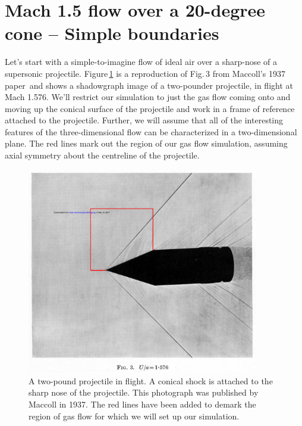 
\section{Mach 1.5 flow over a 20-degree cone -- Simple boundaries}
\label{cone20-simple-sec}
%
Let's start with a simple-to-imagine flow of ideal air over a sharp-nose of a supersonic projectile.
Figure\,\ref{cone20-flight-fig} is a reproduction of Fig.\,3 from Maccoll's 1937 paper\,\cite{maccoll_1937a} 
and shows a shadowgraph image of a two-pounder projectile, in flight at Mach 1.576.
We'll restrict our simulation to just the gas flow coming onto and moving up the conical surface 
of the projectile and work in a frame of reference attached to the projectile.
Further, we will assume that all of the interesting features of the three-dimensional flow can be 
characterized in a two-dimensional plane.
The red lines mark out the region of our gas flow simulation, 
assuming axial symmetry about the centreline of the projectile.

\begin{figure}[htbp]
\begin{center}
\includegraphics[width=0.9\textwidth, viewport=76 168 949 761, clip=true]{../2D/cone20-simple/maccoll-1937-fig3.pdf}
\end{center}
\caption{A two-pound projectile in flight.  A conical shock is attached to the sharp nose of the projectile. 
	 This photograph was published by Maccoll in 1937.
	 The red lines have been added to demark the region of gas flow for which we will set up our simulation.}
\label{cone20-flight-fig}
\end{figure}

